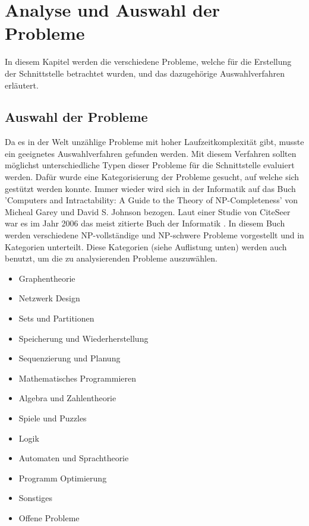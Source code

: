 %
%

\chapter{Analyse und Auswahl der Probleme \resultAssignment{[R1]}}\label{chap.problemauswahl}
In diesem Kapitel werden die verschiedene Probleme, welche für die Erstellung der Schnittstelle betrachtet wurden, und das dazugehörige Auswahlverfahren erläutert.

\section{Auswahl der Probleme}\label{cat_theo_inf}
Da es in der Welt unzählige Probleme mit hoher Laufzeitkomplexität gibt, musste ein geeignetes Auswahlverfahren gefunden werden. Mit diesem Verfahren sollten möglichst unterschiedliche 
Typen dieser Probleme für die Schnittstelle evaluiert werden. Dafür wurde eine Kategorisierung der Probleme gesucht, auf welche sich gestützt werden konnte. Immer wieder wird sich in der 
Informatik auf das Buch 'Computers and Intractability: A Guide to the Theory of NP-Completeness' \cite{garey1979computers} von Micheal Garey und David S. Johnson bezogen. Laut einer 
Studie von CiteSeer war es im Jahr 2006 das meist zitierte Buch der Informatik \cite{citeseer_algo_buch}. In diesem Buch werden verschiedene NP-vollständige und NP-schwere 
Probleme vorgestellt und in Kategorien unterteilt. Diese Kategorien (siehe Auflistung unten) werden auch benutzt, um die zu analysierenden Probleme auszuwählen.

\begin{itemize}
	\item Graphentheorie
	\item Netzwerk Design
	\item Sets und Partitionen
	\item Speicherung und Wiederherstellung
	\item Sequenzierung und Planung
	\item Mathematisches Programmieren
	\item Algebra und Zahlentheorie
	\item Spiele und Puzzles
	\item Logik
	\item Automaten und Sprachtheorie
	\item Programm Optimierung
	\item Sonstiges
	\item Offene Probleme
\end{itemize}

